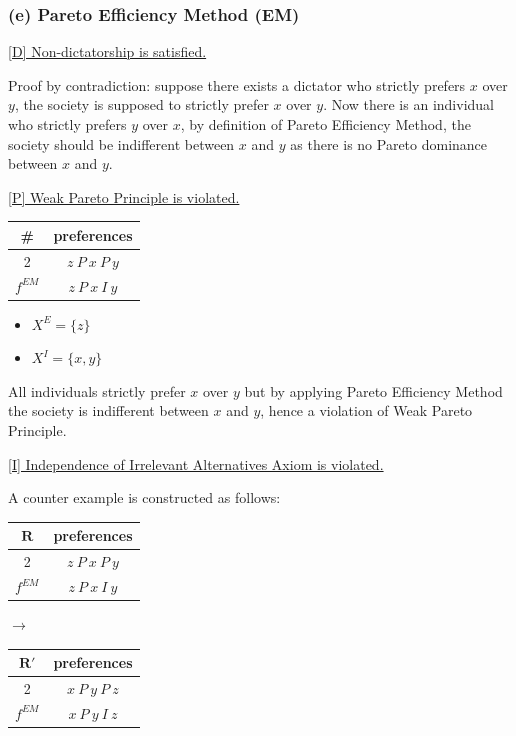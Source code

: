 \documentclass[a4paper]{article}
\begin{document}
\subsubsection*{(e) Pareto Efficiency Method (EM)}

\underline{[D] Non-dictatorship is satisfied.} 

Proof by contradiction: suppose there exists a dictator who strictly prefers $x$ over $y$, the society is supposed to strictly prefer $x$ over $y$. Now there is an individual who strictly prefers $y$ over $x$, by definition of Pareto Efficiency Method, the society should be indifferent between $x$ and $y$ as there is no Pareto dominance between $x$ and $y$.

\underline{[P] Weak Pareto Principle is violated.}

\begin{table}[!htbp]
    \centering
    \begin{tabular}{c|c|}
        \# & preferences         \\ 
        \hline
        2  & $z\: P\: x\: P\: y$ \\
        \hline
        $f^{EM}$ & $z\: P\: x\: I\: y$
    \end{tabular}
\end{table}

\begin{itemize}
    \item $X^E=\{z \}$
    \item $X^I=\{x,y \}$
\end{itemize}

All individuals strictly prefer $x$ over $y$ but by applying Pareto Efficiency Method the society is indifferent between $x$ and $y$, hence a violation of Weak Pareto Principle.

\underline{[I] Independence of Irrelevant Alternatives Axiom is violated.}

A counter example is constructed as follows:

\begin{table}[!htbp]
    \centering
    \begin{tabular}{c|c|}
        $\mathbf{R}$ & preferences         \\ 
        \hline
        2  & $z\: P\: x\: P\: y$ \\
        \hline 
        $f^{EM}$ & $z\: P\: x\: I\: y$
    \end{tabular}
    \qquad $\to$ \qquad
    \centering
    \begin{tabular}{c|c|}
        $\mathbf{R'}$ & preferences         \\ 
        \hline
        2  & $x\: P\: y\: P\: z$ \\
        \hline 
        $f^{EM}$ & $x\: P\: y\: I\: z$
    \end{tabular}
\end{table}
\end{document}
